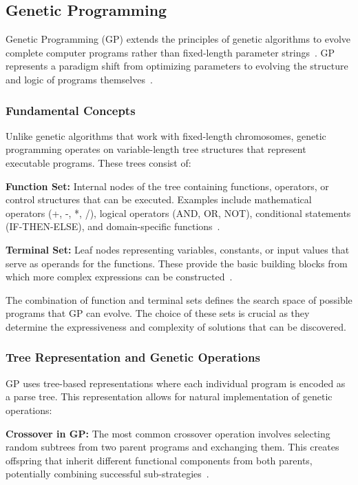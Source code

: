 \documentclass[a4paper,12pt]{article}
\begin{document}
\subsection{Genetic Programming}
Genetic Programming (GP) extends the principles of genetic algorithms to evolve complete computer programs rather than fixed-length parameter strings~\cite{Koza}. 
GP represents a paradigm shift from optimizing parameters to evolving the structure and logic of programs themselves~\cite{GPTut}.

\subsubsection{Fundamental Concepts}
Unlike genetic algorithms that work with fixed-length chromosomes, genetic programming operates on variable-length tree structures that represent executable programs. 
These trees consist of:

\textbf{Function Set:} Internal nodes of the tree containing functions, operators, or control structures that can be executed. Examples include mathematical operators (+, -, *, /), logical operators (AND, OR, NOT), conditional statements (IF-THEN-ELSE), and domain-specific functions~\cite{GPP}.

\textbf{Terminal Set:} Leaf nodes representing variables, constants, or input values that serve as operands for the functions. These provide the basic building blocks from which more complex expressions can be constructed~\cite{GPTut}.

The combination of function and terminal sets defines the search space of possible programs that GP can evolve. The choice of these sets is crucial as they determine the expressiveness and complexity of solutions that can be discovered.

\subsubsection{Tree Representation and Genetic Operations}
GP uses tree-based representations where each individual program is encoded as a parse tree. This representation allows for natural implementation of genetic operations:

\textbf{Crossover in GP:} The most common crossover operation involves selecting random subtrees from two parent programs and exchanging them. This creates offspring that inherit different functional components from both parents, potentially combining successful sub-strategies~\cite{Koza}.
\end{document}
